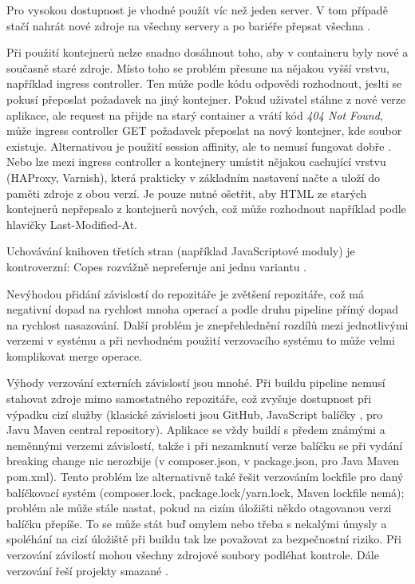             Pro vysokou dostupnost je vhodné použít víc než jeden server. V tom případě stačí nahrát nové zdroje na všechny servery a po bariéře přepsat všechna \HTML.


            Při použití kontejnerů nelze snadno dosáhnout toho, aby v containeru byly nové a současně staré zdroje. Místo toho se problém přesune na nějakou vyšší vrstvu, například ingress controller. Ten může podle \HTTP kódu odpovědi rozhodnout, jeslti se pokusí přeposlat požadavek na jiný kontejner. Pokud uživatel stáhne \HTML z nové verze aplikace, ale request na  přijde na starý container a vrátí kód \textit{404 Not Found}, může ingress controller GET požadavek přeposlat na nový kontejner, kde soubor existuje. Alternativou je použití session affinity, ale to nemusí fungovat dobře . Nebo lze mezi ingress controller a kontejnery umístit nějakou cachující \HTTP vrstvu (HAProxy, Varnish), která prakticky v základním nastavení načte a uloží do paměti zdroje z obou verzí. Je pouze nutné ošetřit, aby HTML ze starých kontejnerů nepřepsalo \HTML z kontejnerů nových, což může rozhodnout například podle hlavičky Last-Modified-At.


            Uchovávání knihoven třetích stran (například JavaScriptové   moduly) je kontroverzní: Copes rozvážně nepreferuje ani jednu variantu \cite{copes-commit-npm} .

             Nevýhodou přidání závislostí do repozitáře je zvětšení repozitáře, což má negativní dopad na rychlost mnoha operací a podle druhu \CICD pipeline přímý dopad na rychlost nasazování. Další problém je znepřehlednění rozdílů mezi jednotlivými verzemi v systému a při nevhodném použití verzovacího systému to může velmi komplikovat merge operace.

             Výhody verzování externích závislostí jsou mnohé. Při buildu \CICD pipeline nemusí stahovat zdroje mimo samostatného repozitáře, což zvyšuje dostupnost při výpadku cizí služby (klasické závislosti jsou GitHub, JavaScript balíčky , pro Javu Maven central repository). Aplikace se vždy buildí s předem známými a neměnnými verzemi závislostí, takže i při nezamknutí verze balíčku se při vydání breaking change nic nerozbije (v  composer.json, v  package.json, pro Java Maven pom.xml). Tento problém lze alternativně také řešit verzováním lockfile pro daný balíčkovací systém (composer.lock, package.lock/yarn.lock, Maven lockfile nemá); problém ale může stále nastat, pokud na cizím úložišti někdo otagovanou verzi balíčku přepíše. To se může stát buď omylem nebo třeba s nekalými úmysly a spoléhání na cizí úložiště při buildu tak lze považovat za bezpečnostní riziko. Při verzování závilostí mohou všechny zdrojové soubory podléhat kontrole. Dále verzování řeší projekty smazané \cite{williams-left-pad}.

